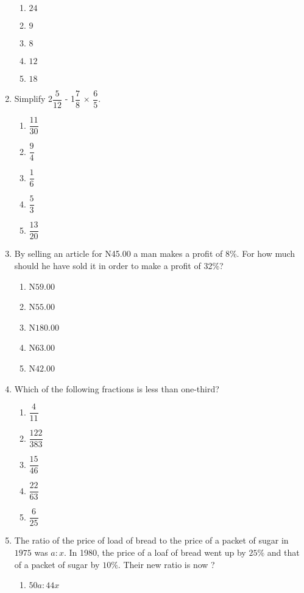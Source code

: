 \begin{multicols}{2}
\begin{enumerate}[label={\arabic*.}]
    \begin{enumerate}[label={\Alph*.}]
    \item \(24\)
    \item \(9\)
    \item \(8\)
    \item \(12\)
    \item \(18\)
    \end{enumerate}
\item Simplify 2\(\dfrac{5}{12}\) - 1\(\dfrac{7}{8}\) \(\times\) \(\dfrac{6}{5}\).
    \begin{enumerate}[label={\Alph*.}]
    \item \(\dfrac{11}{30}\)
    \item \(\dfrac{9}{4}\)
    \item \(\dfrac{1}{6}\)
    \item \(\dfrac{5}{3}\)
    \item \(\dfrac{13}{20}\)
    \end{enumerate}
\item By selling an article for N45.00 a man makes a profit of 8\%. For how much should he have sold it in order to make a profit of 32\%? 
    \begin{enumerate}[label={\Alph*.}]
    \item N\(59.00\)
    \item N\(55.00\)
    \item N\(180.00\)
    \item N\(63.00\)
    \item N\(42.00\)
    \end{enumerate}
\item Which of the following fractions is less than one-third?
    \begin{enumerate}[label={\Alph*.}]
    \item \(\dfrac{4}{11}\)
    \item \(\dfrac{122}{383}\)
    \item \(\dfrac{15}{46}\)
    \item \(\dfrac{22}{63}\)
    \item \(\dfrac{6}{25}\)
    \end{enumerate}
\item The ratio of the price of load of bread to the price of a packet of sugar in \(1975\) was \(a:x\). In 1980,  the price of a loaf of bread went up by \(25\%\) and that of a packet of sugar by \(10\%\). Their new ratio is now ?
    \begin{enumerate}[label={\Alph*.}]
    \item \(50a:44x\)

\end{enumerate}
\end{enumerate}
\end{multicols}
